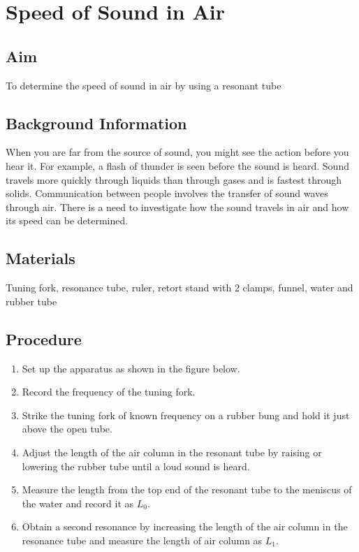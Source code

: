 \chapter{Speed of Sound in Air}

\section{Aim}
To determine the speed of sound in air by using a resonant tube

\section{Background Information}
When you are far from the source of sound, you might see the action before you hear it. For example, a flash of thunder is seen before the sound is heard. Sound travels more quickly through liquids than through gases and is fastest through solids. Communication between people involves the transfer of sound waves through air. There is a need to investigate how the sound travels in air and how its speed can be determined.

\section{Materials}
Tuning fork, resonance tube, ruler, retort stand with 2 clamps, funnel, water and rubber tube

\section{Procedure}
\begin{enumerate}
\item Set up the apparatus as shown in the figure below.
\item Record the frequency of the tuning fork.
\item Strike the tuning fork of known frequency on a rubber bung and hold it just above the open tube.
\item Adjust the length of the air column in the resonant tube by raising or lowering the rubber tube until a loud sound is heard. 
\item Measure the length from the top end of the resonant tube to the meniscus of the water and record it as $L_0$.
\item Obtain a second resonance by increasing the length of the air column in the resonance tube and measure the length of air column as $L_1$.
\end{enumerate}

